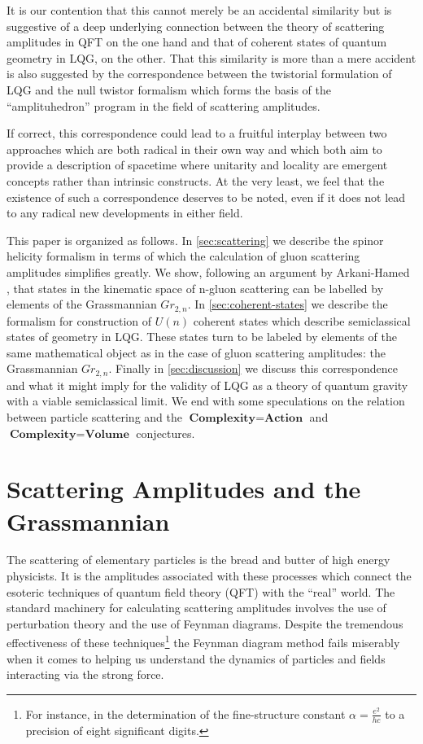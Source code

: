 \documentclass[twocolumn,final,aps,nofootinbib,nobibnotes]{revtex4-2}
\begin{document}
It is our contention that this cannot merely be an accidental similarity but is suggestive of a deep underlying connection between the theory of scattering amplitudes in QFT on the one hand and that of coherent states of quantum geometry in LQG, on the other. That this similarity is more than a mere accident is also suggested by the correspondence between the twistorial formulation of LQG and the null twistor formalism which forms the basis of the ``amplituhedron'' program \cite{Arkani-Hamed2014The-Amplituhedron} in the field of scattering amplitudes.

If correct, this correspondence could lead to a fruitful interplay between two approaches which are both radical in their own way and which both aim to provide a description of spacetime where unitarity and locality are emergent concepts rather than intrinsic constructs. At the very least, we feel that the existence of such a correspondence deserves to be noted, even if it does not lead to any radical new developments in either field.

This paper is organized as follows. In \autoref{sec:scattering} we describe the spinor helicity formalism in terms of which the calculation of gluon scattering amplitudes simplifies greatly. We show, following an argument by Arkani-Hamed \cite{Arkani-Hamed2019Spacetime}, that states in the kinematic space of n-gluon scattering can be labelled by elements of the Grassmannian $ Gr_{2,n} $. In \autoref{sec:coherent-states} we describe the formalism for construction of $ U(n) $ coherent states which describe semiclassical states of geometry in LQG. These states turn to be labeled by elements of the same mathematical object as in the case of gluon scattering amplitudes: the Grassmannian $ Gr_{2,n} $. Finally in \autoref{sec:discussion} we discuss this correspondence and what it might imply for the validity of LQG as a theory of quantum gravity with a viable semiclassical limit. We end with some speculations on the relation between particle scattering and the $ \textbf{Complexity} = \textbf{Action} $ and $ \textbf{Complexity} = \textbf{Volume} $ conjectures.

\section{Scattering Amplitudes and the Grassmannian}\label{sec:scattering}

The scattering of elementary particles is the bread and butter of high energy physicists. It is the amplitudes associated with these processes which connect the esoteric techniques of quantum field theory (QFT) with the ``real'' world. The standard machinery for calculating scattering amplitudes involves the use of perturbation theory and the use of Feynman diagrams. Despite the tremendous effectiveness of these techniques\footnote{For instance, in the determination of the fine-structure constant $ \alpha = \frac{e^2}{hc} $ to a precision of eight significant digits.} the Feynman diagram method fails miserably when it comes to helping us understand the dynamics of particles and fields interacting via the strong force.
\end{document}
